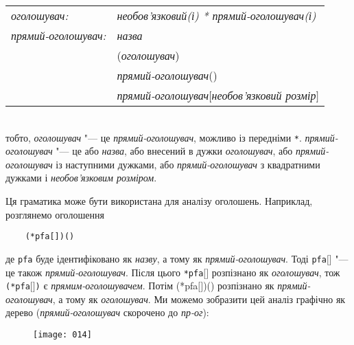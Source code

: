 \documentclass[a4paper,12pt]{book}
\begin{document}
  \vspace{12pt} 
  \begin{tabular}{ll}
  \textit{оголошувач:} & \textit{необов'язковий(і) * прямий-оголошувач(і)}\\
  \textit{прямий-оголошувач:} & \textit{назва} \\
                              & (\textit{оголошувач}) \\
                              & \textit{прямий-оголошувач}() \\
                              & \textit{прямий-оголошувач}\mbox{$[$}\textit{необов'язковий розмір}\mbox{$]$} \\
  \end{tabular}
  \vspace{12pt}
  \\
  тобто, \textit{оголошувач} "--- це \textit{прямий-оголошувач}, можливо із передніми \texttt{*}.
  \textit{прямий-оголошувач} "--- це або \textit{назва}, або внесений в дужки
  \textit{оголошувач}, або \textit{прямий-оголошувач} із наступними дужками, або
  \textit{прямий-оголошувач} з квадратними дужками і \textit{необов'язковим розміром}.

  Ця граматика може бути використана для аналізу оголошень. Наприклад, розглянемо
  оголошення
  \begin{verbatim}
    (*pfa[])()
  \end{verbatim}
  де \texttt{pfa} буде ідентифіковано як \textit{назву}, а тому як
  \textit{прямий-оголошувач}. Тоді \texttt{pfa\mbox{$[$}\mbox{$]$}} "--- це також
  \textit{прямий-оголошувач}. Після цього \texttt{*pfa\mbox{$[$}\mbox{$]$}} розпізнано як
  \textit{оголошувач}, тож \texttt{(*pfa\mbox{$[$}\mbox{$]$})} є
  \textit{прямим-оголошувачем}. Потім (*pfa\mbox{$[$}\mbox{$]$})() розпізнано як
  \textit{прямий-оголошувач}, а тому як \textit{оголошувач}. Ми можемо зобразити цей
  аналіз графічно як дерево (\textit{прямий-оголошувач} скорочено до \textit{пр-ог}):

  \begin{figure}[!htb]
  \centering
  \texttt{[image: 014]}
  \end{figure}
\end{document}
